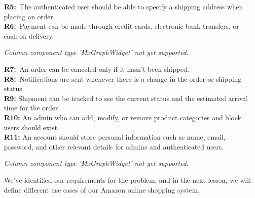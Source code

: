 \noindent
\begin{minipage}[t]{0.48\textwidth}\vspace{0pt}
\textbf{R5:}~The authenticated user should be able to specify a shipping address when placing an order.
\\
\textbf{R6:}~Payment can be made through credit cards, electronic bank transfers, or cash on delivery.
\end{minipage}
\hfill
\begin{minipage}[t]{0.48\textwidth}\vspace{0pt}
\textit{Column component type 'MxGraphWidget' not yet supported.}
\end{minipage}

\noindent
\begin{minipage}[t]{0.48\textwidth}\vspace{0pt}
\textbf{R7:}~An order can be canceled only if it hasn't been shipped.
\\
\textbf{R8:}~Notifications are sent whenever there is a change in the order or shipping status.
\\
\textbf{R9:} Shipment can be tracked to see the current status and the estimated arrival time for the order.
\\
\textbf{R10:} An admin who can add, modify, or remove product categories and block users should exist.
\\
\textbf{R11:} An account should store personal information such as name, email, password, and other relevant details for admins and authenticated users.
\end{minipage}
\hfill
\begin{minipage}[t]{0.48\textwidth}\vspace{0pt}
\textit{Column component type 'MxGraphWidget' not yet supported.}
\end{minipage}

We've identified our requirements for the problem, and in the next lesson, we will define different use cases of our Amazon online shopping system.

